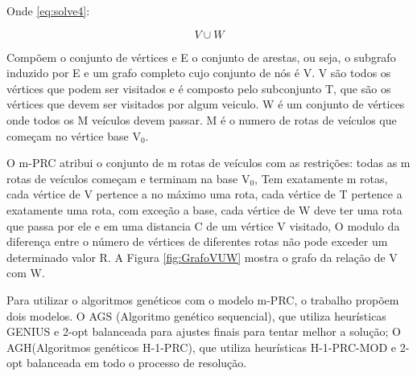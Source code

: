 Onde \ref{eq:solve4}: 

\begin{equation} \label{eq:solve4}
V\cup W
\end{equation}


Compõem o conjunto de vértices e E o conjunto de arestas, ou seja, o subgrafo induzido por E e um grafo completo cujo conjunto de nós é V. 
V são todos os vértices que podem ser visitados e é composto pelo subconjunto T, que são os vértices que devem ser visitados por algum veiculo. W é um conjunto de vértices onde todos os M veículos devem passar. M é o numero de rotas de veículos que começam no vértice base V$_0$. 

O m-PRC atribui o conjunto de m rotas de veículos com as restrições: todas as m rotas de veículos começam e terminam na base V$_0$, Tem exatamente m rotas, cada vértice de V pertence a no máximo uma rota, cada vértice de T pertence a exatamente uma rota, com exceção a base, cada vértice de W deve ter uma rota que passa por ele e em uma distancia C de um vértice V visitado, O modulo da diferença entre o número de vértices de diferentes rotas não pode exceder um determinado valor R. A Figura \ref{fig:GrafoVUW} mostra o grafo da relação de V com W.

\begin{minipage}{\linewidth}
	\label{fig:GrafoVUW}
\end{minipage}

Para utilizar o algoritmos genéticos com o modelo m-PRC, o trabalho propõem dois modelos. O AGS (Algoritmo genético sequencial), que utiliza heurísticas GENIUS e 2-opt balanceada para ajustes finais para tentar melhor a solução; O AGH(Algoritmos genéticos H-1-PRC), que utiliza heurísticas H-1-PRC-MOD e 2-opt balanceada em todo o processo de resolução.


